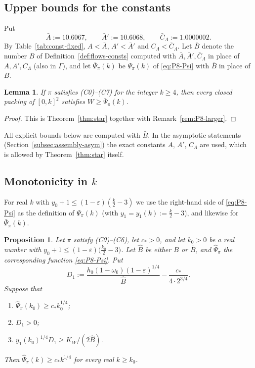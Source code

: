 \documentclass[11pt]{amsart}
\newcommand{\eps}{\varepsilon}
\newcommand{\Lam}{\Lambda}
\newtheorem{proposition}[theorem]{Proposition}
\newtheorem{lemma}[theorem]{Lemma}
\theoremstyle{definition}
\theoremstyle{remark}
\numberwithin{equation}{section}
\begin{document}
\subsection{Upper bounds for the constants}\label{subsec:assembly-upper}

Put
\[
\bar A:=10.6067,\qquad \bar A':=10.6068,\qquad \bar C_\Lam:=1.0000002 .
\]
By Table~\ref{tab:const-fixed}, $A<\bar A$, $A'<\bar A'$ and $C_\Lam<\bar C_\Lam$. Let $\bar B$ denote the number $B$
of Definition~\ref{def:flows-consts} computed with $\bar A,\bar A',\bar C_\Lam$ in place of $A,A',C_\Lam$ (also in
$\Gamma$), and let $\bar\Psi_\pi(k)$ be $\Psi_\pi(k)$ of \eqref{eq:P8-Psi} with $\bar B$ in place of $B$.

\begin{lemma}\label{lem:assembly-upper}
If $\pi$ satisfies \textup{(C0)--(C7)} for the integer $k\ge4$, then every closed packing of $[0,k]^2$ satisfies
$W\ge\bar\Psi_\pi(k)$.
\end{lemma}

\begin{proof}
This is Theorem~\ref{thm:star} together with Remark~\ref{rem:P8-larger}.
\end{proof}

All explicit bounds below are computed with $\bar B$. In the asymptotic statements (Section~\ref{subsec:assembly-asym})
the exact constants $A$, $A'$, $C_\Lam$ are used, which is allowed by Theorem~\ref{thm:star} itself.

\subsection{Monotonicity in \texorpdfstring{$k$}{k}}\label{subsec:assembly-mono}

For real $k$ with $y_0+1\le(1-\eps)(\frac k2-3)$ we use the right-hand side of \eqref{eq:P8-Psi} as the definition of
$\Psi_\pi(k)$ (with $y_1=y_1(k):=\frac k2-3$), and likewise for $\bar\Psi_\pi(k)$.

\begin{proposition}\label{prop:monotone}
Let $\pi$ satisfy \textup{(C0)--(C6)}, let $c_*>0$, and let $k_0>0$ be a real number with
$y_0+1\le(1-\eps)\big(\frac{k_0}2-3\big)$. Let $\hat B$ be either $B$ or $\bar B$, and $\hat\Psi_\pi$ the corresponding
function \eqref{eq:P8-Psi}. Put
\[
D_1:=\frac{h_0(1-\omega_0)(1-\eps)^{1/4}}{\hat B}-\frac{c_*}{4\cdot2^{3/4}} .
\]
Suppose that
\begin{enumerate}[label=\textup{(\roman*)}]
\item $\hat\Psi_\pi(k_0)\ge c_*k_0^{1/4}$;
\item $D_1>0$;
\item $y_1(k_0)^{1/4}D_1\ge K_W/(2\hat B)$.
\end{enumerate}
Then $\hat\Psi_\pi(k)\ge c_*k^{1/4}$ for every real $k\ge k_0$.
\end{proposition}
\end{document}
